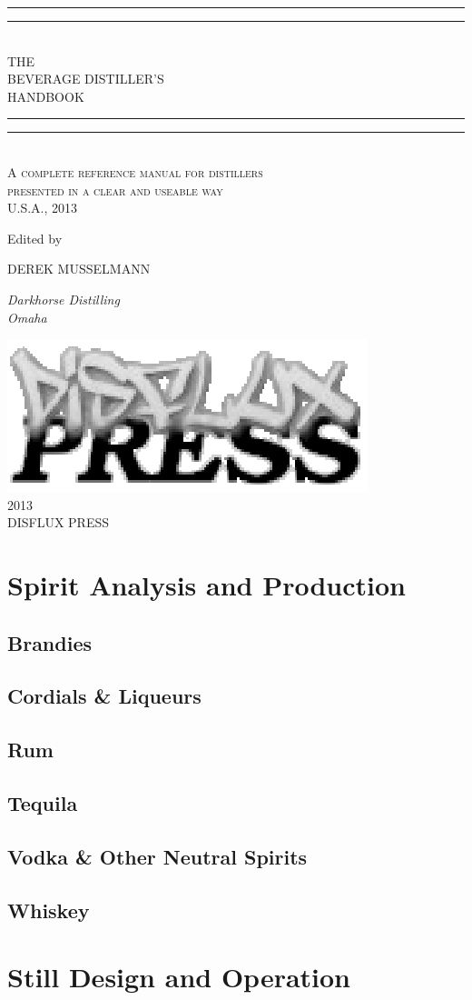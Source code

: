 \documentclass[10pt,ebook,extrafontsizes]{memoir}
\newcommand*{\titleGP}{\begingroup %
\centering %
\vspace*{\baselineskip} %

\rule{\textwidth}{1.6pt}\vspace*{-\baselineskip}\vspace*{2pt} %
\rule{\textwidth}{0.4pt}\\[\baselineskip] %

{\LARGE THE \\ BEVERAGE DISTILLER'S \\[0.3\baselineskip] HANDBOOK}\\[0.2\baselineskip] %

\rule{\textwidth}{0.4pt}\vspace*{-\baselineskip}\vspace{3.2pt} %
\rule{\textwidth}{1.6pt}\\[\baselineskip] %

\scshape %
A complete reference manual for distillers\\ %
presented  in a clear and useable way \\[\baselineskip] %
U.S.A.,  2013\par %

\vspace*{2\baselineskip} %

Edited by \\[\baselineskip]
{\Large DEREK MUSSELMANN\par} %
{\itshape Darkhorse Distilling \\ Omaha\par} %

\vfill %
\includegraphics[scale=0.55]{disfluxpress.eps} \\[0.3\baselineskip]
{\scshape 2013} \\[0.3\baselineskip] %
{\large DISFLUX PRESS}\par %

\endgroup}
\begin{document}
\pagestyle{empty}
\titleGP
\clearpage
\tableofcontents
\pagestyle{plain}

\part{Spirit Analysis and Production}

\chapter{Brandies}

\chapter{Cordials \& Liqueurs}





\chapter{Rum}

\chapter{Tequila}

\chapter{Vodka \& Other Neutral Spirits}

\chapter{Whiskey}

\part{Still Design and Operation}

\clearpage
\printbibliography
\printindex
\end{document}
